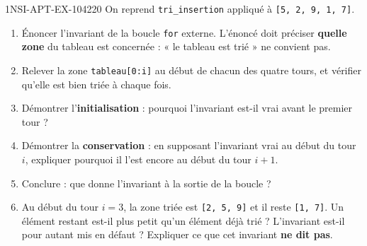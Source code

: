 \begin{exercice}{1NSI-APT-EX-104}{2}{20}
On reprend \lstinline{tri_insertion} appliqué à \lstinline{[5, 2, 9, 1, 7]}.
\begin{enumerate}
  \item Énoncer l'invariant de la boucle \lstinline{for} externe. L'énoncé doit préciser
    \textbf{quelle zone} du tableau est concernée : « le tableau est trié » ne convient pas.
  \item Relever la zone \lstinline{tableau[0:i]} au début de chacun des quatre tours, et
    vérifier qu'elle est bien triée à chaque fois.
  \item Démontrer l'\textbf{initialisation} : pourquoi l'invariant est-il vrai avant le
    premier tour ?
  \item Démontrer la \textbf{conservation} : en supposant l'invariant vrai au début du tour
    $i$, expliquer pourquoi il l'est encore au début du tour $i+1$.
  \item Conclure : que donne l'invariant à la sortie de la boucle ?
  \item Au début du tour $i=3$, la zone triée est \lstinline{[2, 5, 9]} et il reste
    \lstinline{[1, 7]}. Un élément restant est-il plus petit qu'un élément déjà trié ?
    L'invariant est-il pour autant mis en défaut ? Expliquer ce que cet invariant
    \textbf{ne dit pas}.
\end{enumerate}
\end{exercice}
